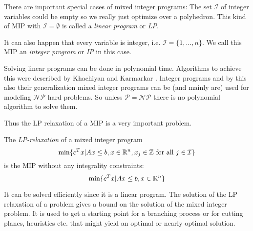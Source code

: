 There are important special cases of mixed integer programs: The set $\mathcal{I}$ of integer variables could be empty 
so we really just optimize over a polyhedron. This kind of MIP with $\mathcal{I}=\emptyset$ is called a \textit{linear 
program} or \textit{LP}. 

It can also happen that every variable is integer, i.e. $\mathcal{I}=\{1,\dots, n\}$. We call this MIP an 
\textit{integer program} or \textit{IP} in this case.

Solving linear programs can be done in polynomial time. Algorithms to achieve this were described by 
Khachiyan\cite{KHACHIYAN198053} and Karmarkar \cite{Karmarkar:1984:NPA:800057.808695}. Integer programs and by this 
also their generalization mixed integer programs can be (and mainly are) used for modeling $\mathcal{NP}$ hard 
problems. So unless $\mathcal{P}=\mathcal{NP}$ there is no polynomial algorithm to solve them.

Thus the LP relaxation of a MIP is a very important problem.
\begin{definition}
 The \textit{LP-relaxation} of a mixed integer program 
 $$\min\{c^T x|Ax\le b, x\in\mathbb{R}^n, x_j\in\mathbb{Z}\textrm{ for all }j\in\mathcal{I} \}$$
 is the MIP without any integrality constraints:
 $$\min\{c^T x|Ax\le b, x\in\mathbb{R}^n \}$$
\end{definition}

It can be solved efficiently since it is a linear program. The solution of the LP relaxation of a problem gives a
bound on the solution of the mixed integer problem. It is used to get a starting 
point for a branching process or for cutting planes, heuristics etc. that might yield an optimal or nearly optimal 
solution. 
